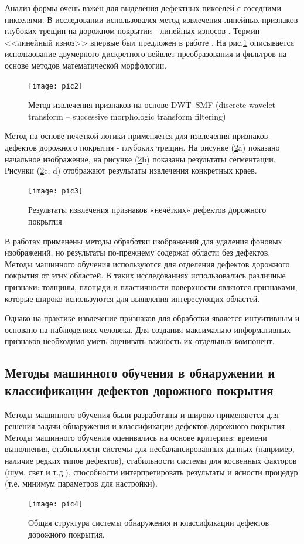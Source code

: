 \documentclass[a4paper,14pt]{extreport}
\begin{document}
Анализ формы очень важен для выделения дефектных пикселей с соседними пикселями. В исследовании использовался метод извлечения линейных признаков глубоких трещин на дорожном покрытии - линейных износов \cite{h102}. Термин <<линейный изноз>> впервые был предложен в работе \cite{20wl}. На рис.\ref{pic2} описывается использование двумерного дискретного вейвлет-преобразования и фильтров на основе методов математической морфологии.
\begin{figure}[ht!]
\centering
\texttt{[image: pic2]}
\caption{Метод извлечения признаков на основе DWT--SMF (discrete wavelet transform -- successive morphologic transform filtering) \cite{h102}}
	\label{pic2}
	\end{figure}

Метод на основе нечеткой логики применяется для извлечения признаков дефектов дорожного покрытия - глубоких трещин. На рисунке (\ref{pic3}a) показано начальное изображение, на рисунке (\ref{pic3}b) показаны результаты сегментации. Рисунки (\ref{pic3}c, d) отображают результаты извлечения конкретных краев.
\begin{figure}[ht!]
\centering
\texttt{[image: pic3]}
\caption{Результаты извлечения признаков «нечётких» дефектов дорожного покрытия \cite{h102}}
	\label{pic3}
	\end{figure}
	
В работах \cite{h79, h80, h81, h82} применены методы обработки изображений для удаления фоновых изображений, но результаты по-прежнему содержат области без дефектов. Методы машинного обучения используются для отделения дефектов дорожного покрытия от этих областей. В таких исследованиях использовались различные признаки: толщины, площади и пластичности поверхности являются признаками, которые широко используются для выявления интересующих областей.
	
Однако на практике извлечение признаков для обработки является интуитивным и основано на наблюдениях человека. Для создания максимально информативных признаков необходимо уметь оценивать важность их отдельных компонент.
\subsection{Методы машинного обучения в обнаружении и классификации дефектов дорожного покрытия}
Методы машинного обучения были разработаны и широко применяются для решения задачи обнаружения и классификации дефектов дорожного покрытия. Методы машинного обучения оценивались на основе критериев: времени выполнения, стабильности системы для несбалансированных данных (например, наличие редких типов дефектов), стабильности системы для косвенных факторов (шум, свет и т.д.), способности интерпретировать результаты и ясности процедур (т.е. минимум параметров для настройки).
\begin{figure}[ht!]
\centering
\texttt{[image: pic4]}
\caption{Общая структура системы обнаружения и классификации дефектов дорожного покрытия.}
	\label{pic4}
	\end{figure}
	
\end{document}
